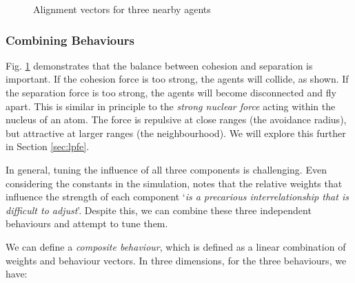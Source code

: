 \documentclass[12pt]{article}
\begin{document}
\begin{figure}[H]
    \centering
    \caption{Alignment vectors for three nearby agents}
    \label{fig:cohesion-2d}
\end{figure}

\subsubsection{Combining Behaviours}
\label{sec:combining-behaviours}

Fig. \ref{fig:cohesion-2d} demonstrates that the balance between cohesion and separation is important. If the cohesion force is too strong, the agents will collide, as shown. If the separation force is too strong, the agents will become disconnected and fly apart. This is similar in principle to the \emph{strong nuclear force} acting within the nucleus of an atom. The force is repulsive at close ranges (the avoidance radius), but attractive at larger ranges (the neighbourhood). We will explore this further in Section \ref{sec:lpfe}.

In general, tuning the influence of all three components is challenging. Even considering the constants in the simulation, \citet{Reynolds} notes that the relative weights that influence the strength of each component `\emph{is a precarious interrelationship that is difficult to adjust}'. Despite this, we can combine these three independent behaviours and attempt to tune them. 

We can define a \emph{composite behaviour}, which is defined as a linear combination of weights and behaviour vectors. In three dimensions, for the three behaviours, we have:
\end{document}

